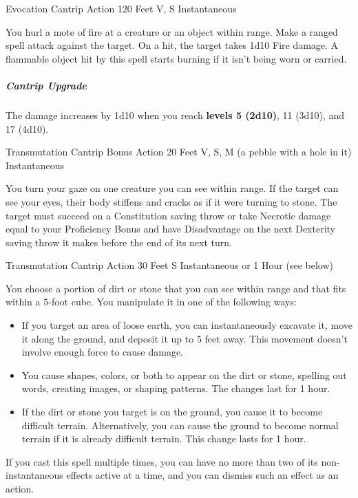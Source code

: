 \documentclass[letterpaper,openany,oneside,twocolumn]{book}
\begin{document}
	{Evocation Cantrip}
	{Action}
	{120 Feet}
	{V, S}
	{Instantaneous}

You hurl a mote of fire at a creature or an object within range. Make a ranged spell attack against the target. On a hit, the target takes 1d10 Fire damage. A flammable object hit by this spell starts burning if it isn't being worn or carried.

\subparagraph*{Cantrip Upgrade} The damage increases by 1d10 when you reach \textbf{levels 5 (2d10)}, 11 (3d10), and 17 (4d10).

	{Transmutation Cantrip}
	{Bonus Action}
	{20 Feet}
	{V, S, M (a pebble with a hole in it)}
	{Instantaneous}

You turn your gaze on one creature you can see within range. If the target can see your eyes, their body stiffens and cracks as if it were turning to stone. The target must succeed on a Constitution saving throw or take Necrotic damage equal to your Proficiency Bonus and have Disadvantage on the next Dexterity saving throw it makes before the end of its next turn.

	{Transmutation Cantrip}
	{Action}
	{30 Feet}
	{S}
	{Instantaneous or 1 Hour (see below)}

You choose a portion of dirt or stone that you can see within range and that fits within a 5-foot cube. You manipulate it in one of the following ways:

\begin{itemize}
	\item If you target an area of loose earth, you can instantaneously excavate it, move it along the ground, and deposit it up to 5 feet away. This movement doesn't involve enough force to cause damage.
	\item You cause shapes, colors, or both to appear on the dirt or stone, spelling out words, creating images, or shaping patterns. The changes last for 1 hour.
	\item If the dirt or stone you target is on the ground, you cause it to become difficult terrain. Alternatively, you can cause the ground to become normal terrain if it is already difficult terrain. This change lasts for 1 hour.
\end{itemize}

If you cast this spell multiple times, you can have no more than two of its non-instantaneous effects active at a time, and you can dismiss such an effect as an action.
\end{document}
